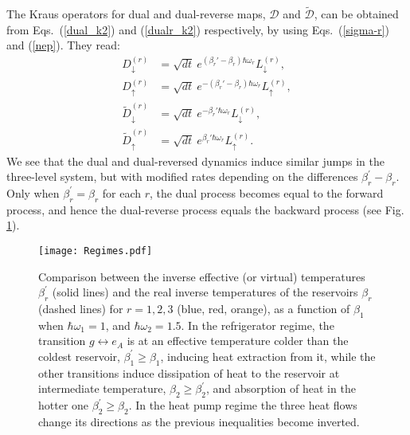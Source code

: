 \documentclass[aps,prx,twocolumn,showpacs,floatfix,superscriptaddress,graphics,longbibliography]{revtex4-1}
\newcommand{\D}{{\mathcal D}}
\begin{document}
The Kraus operators for dual and dual-reverse maps, $\D$ and $\tilde{\D}$, can be obtained from Eqs.~(\ref{dual_k2}) and (\ref{dualr_k2}) respectively, 
by using Eqs.~(\ref{sigma-r}) and (\ref{nep}). They read:
\begin{eqnarray}
 D_\downarrow^{(r)} &= \sqrt{dt} ~ e^{(\beta_r' - \beta_r) \hbar \omega_r} L_\downarrow^{(r)},   \\ 
 D_\uparrow^{(r)} &= \sqrt{dt} ~ e^{-(\beta_r' - \beta_r) \hbar \omega_r} L_\uparrow^{(r)},  \\
\tilde{D}_\downarrow^{(r)} &= \sqrt{dt} ~ e^{-\beta_r' \hbar \omega_r} L_\downarrow^{(r)},  \\ 
\tilde{D}_\uparrow^{(r)} &= \sqrt{dt} ~ e^{\beta_r' \hbar \omega_r} L_\uparrow^{(r)}. 
\end{eqnarray}
We see that the dual and dual-reversed dynamics induce similar jumps in the three-level system, 
but with modified rates depending on the differences $\beta_r^\prime - \beta_r$. Only when $\beta_r^\prime = \beta_r$ for each $r$, the dual process becomes equal to the forward process, 
and hence the dual-reverse process equals the backward process (see Fig. \ref{F-Regimes}).


\begin{figure}[t]
\texttt{[image: Regimes.pdf]}
\caption{Comparison between the inverse effective (or virtual) temperatures $\beta_r^\prime$ (solid lines) and the real inverse temperatures of the reservoirs $\beta_r$ (dashed lines) 
for $r=1,2,3$ (blue, red, orange), as a function of $\beta_1$ when $\hbar\omega_1 = 1$, and $\hbar\omega_2 = 1.5$. In the refrigerator regime, the transition 
$g \leftrightarrow e_A$ is at an effective temperature colder than the coldest reservoir, $\beta_1^\prime \geq \beta_1$, inducing heat extraction from it, while the other transitions 
induce dissipation of heat to the reservoir at intermediate temperature, $\beta_2 \geq \beta_2^\prime$, and absorption of heat in the hotter one $\beta_2^\prime \geq \beta_2$. In 
the heat pump regime the three heat flows change its directions as the previous inequalities become inverted.} 
\label{F-Regimes}
\end{figure}
\end{document}
